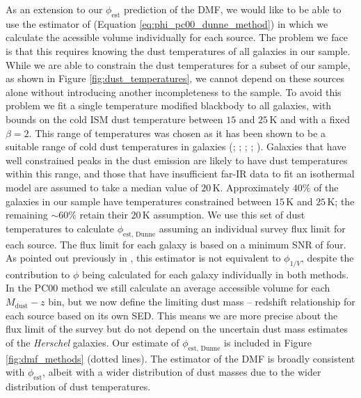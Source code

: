 As an extension to our $\phi_{\textrm{est}}$ prediction of the DMF, we would like to be able to use the estimator of \citealt{Dunne_2011} (Equation \ref{eq:phi_pc00_dunne_method}) in which we calculate the acessible volume individually for each source. The problem we face is that this requires knowing the dust temperatures of all galaxies in our sample. While we are able to constrain the dust temperatures for a subset of our sample, as shown in Figure \ref{fig:dust_temperatures}, we cannot depend on these sources alone without introducing another incompleteness to the sample. To avoid this problem we fit a single temperature modified blackbody to all galaxies, with bounds on the cold ISM dust temperature between $15$ and $25\,$K and with a fixed $\beta = 2$. This range of temperatures was chosen as it has been shown to be a suitable range of cold dust temperatures in galaxies (\citealt{Dunne_2001}; \citealt{daCunha_2008}; \citealt{Smith_2012b}; \citealt{Clark_2015}; \citealt{Beeston_2018}). Galaxies that have well constrained peaks in the dust emission are likely to have dust temperatures within this range, and those that have insufficient far-IR data to fit an isothermal model are assumed to take a median value of $20\,$K. Approximately $40\%$ of the galaxies in our sample have temperatures constrained between $15\,$K and $25\,$K; the remaining $\sim 60\%$ retain their $20\,$K assumption. We use this set of dust temperatures to calculate $\phi_{\textrm{est, Dunne}}$ assuming an individual survey flux limit for each source. The flux limit for each galaxy is based on a minimum SNR of four. As pointed out previously in \citealt{Dunne_2011}, this estimator is not equivalent to $\phi_{1/V}$, despite the contribution to $\phi$ being calculated for each galaxy individually in both methods. In the PC00 method we still calculate an average accessible volume for each $M_{\textrm{dust}} - z$ bin, but we now define the limiting dust mass -- redshift relationship for each source based on its own SED. This means we are more precise about the flux limit of the survey but do not depend on the uncertain dust mass estimates of the \textit{Herschel} galaxies. Our estimate of $\phi_{\textrm{est, Dunne}}$ is included in Figure \ref{fig:dmf_methods} (dotted lines). The \citealt{Dunne_2011} estimator of the DMF is broadly consistent with $\phi_{\textrm{est}}$, albeit with a wider distribution of dust masses due to the wider distribution of dust temperatures.

